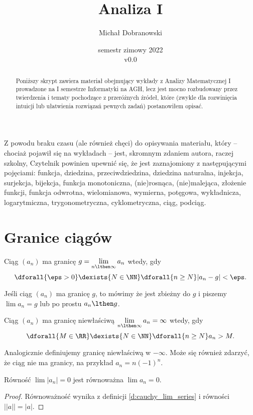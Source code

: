\documentclass[11pt]{scrartcl}
\title{Analiza I}
\author{Michał Dobranowski}
\date{semestr zimowy 2022 \\ v0.0}
\begin{document}
    \maketitle
    \begin{abstract}
        Poniższy skrypt zawiera materiał obejmujący wykłady z Analizy Matematycznej I prowadzone na I semestrze Informatyki na AGH, lecz jest mocno rozbudowany przez twierdzenia i tematy pochodzące z przeróżnych źródeł, które (zwykle dla rozwinięcia intuicji lub ułatwienia rozwiązań pewnych zadań) postanowiłem opisać.
    \end{abstract}
    \tableofcontents
    \eject

    Z powodu braku czasu (ale również chęci) do opisywania materiału, który -- chociaż pojawił się na wykładach -- jest, skromnym zdaniem autora, raczej szkolny, Czytelnik powinien upewnić się, że jest zaznajomiony z następującymi pojęciami: funkcja, dziedzina, przeciwdziedzina, dziedzina naturalna, injekcja, surjekcja, bijekcja, funkcja monotoniczna, (nie)rosnąca, (nie)malejąca, złożenie funkcji, funkcja odwrotna, wielomianowa, wymierna, potęgowa, wykładnicza, logarytmiczna, trygonometryczna, cyklometryczna, ciąg, podciąg.

    \section{Granice ciągów}
    \begin{definition}
        \label{d:cauchy_lim_series}
        Ciąg $(a_n)$ ma granicę $g = \displaystyle\lim_{n\lthen\infty} a_n$ wtedy, gdy
        \[ \dforall{\eps > 0} \dexists{N \in\NN} \dforall{n\geq N} |a_n - g| < \eps. \]
    \end{definition}

    Jeśli ciąg $(a_n)$ ma granicę $g$, to mówimy że jest zbieżny do $g$ i piszemy $\lim a_n = g$ lub po prostu $a_n \lthen g$.

    \begin{definition}
        Ciąg $(a_n)$ ma granicę niewłaściwą $\displaystyle\lim_{n\lthen\infty} a_n = \infty$ wtedy, gdy
        \[ \dforall{M\in\RR} \dexists{N\in\NN} \dforall{n\geq N} a_n > M. \]
    \end{definition}

    Analogicznie definiujemy granicę niewłaściwą w $-\infty$. Może się również zdarzyć, że ciąg nie ma granicy, na przykład $a_n = n(-1)^n$.

    \begin{fact}
        Równość $\lim |a_n| = 0$ jest równoważna $\lim a_n = 0$.
    \end{fact}
    \begin{proof}
        Równoważność wynika z definicji \ref{d:cauchy_lim_series} i równości $\left||a|\right| = |a|$.
    \end{proof}
\end{document}
